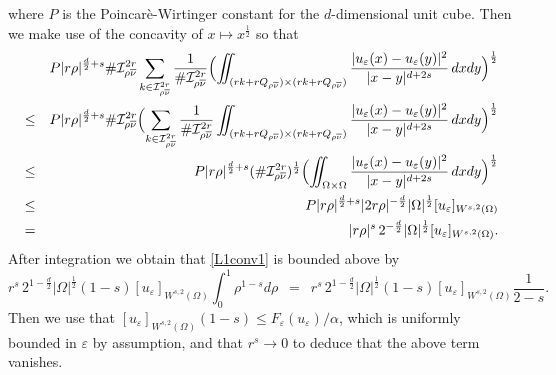\documentclass[11pt,a4paper,reqno]{amsart}
\theoremstyle{plain}
\theoremstyle{definition}
\newcommand\e{\varepsilon}
\theoremstyle{remark}
\begin{document}
where $P$ is the Poincarè-Wirtinger constant for the  $d$-dimensional unit cube. Then we make use of the concavity of $x\mapsto x^{\frac{1}{2}}$ so that   
\begin{eqnarray*} && \hskip-1.8cm \nonumber
P|r\rho|^{\frac{d}{2}+s} \# \mathcal{I}^{2r}_{\rho\overline{\nu}} \sum_{k\in \mathcal{I}^{2r}_{\rho\overline{\nu}}}\frac{1}{\# \mathcal{I}^{2r}_{\rho\overline{\nu}}} \Bigl(\iint_{(rk+rQ_{\rho\overline{\nu}})\times(rk+rQ_{\rho\overline{\nu}})}\frac{|u_\e(x)-u_\e(y)|^2}{|x-y|^{d+2s}}\,dxdy\Bigr)^{\frac{1}{2}} \\ \nonumber
&\leq& P|r\rho|^{\frac{d}{2}+s} \# \mathcal{I}^{2r}_{\rho\overline{\nu}} \Bigl( \sum_{k\in \mathcal{I}^{2r}_{\rho\overline{\nu}}} \frac{1}{\# \mathcal{I}^{2r}_{\rho\overline{\nu}}} \iint_{(rk+rQ_{\rho\overline{\nu}})\times(rk+rQ_{\rho\overline{\nu}})}\frac{|u_\e(x)-u_\e(y)|^2}{|x-y|^{d+2s}}\,dxdy  \Bigr)^{\frac{1}{2}} \\ \nonumber
&\leq& P|r\rho|^{\frac{d}{2}+s}  (\# \mathcal{I}^{2r}_{\rho\overline{\nu}})^{\frac{1}{2}} \Bigl( \iint_{\Omega \times \Omega}\frac{|u_\e(x)-u_\e(y)|^2}{|x-y|^{d+2s}}\,dxdy \Bigr)^{\frac{1}{2}} \\ \nonumber
&\leq& P|r\rho|^{\frac{d}{2}+s} |2 r\rho|^{-\frac{d}{2}}|\Omega|^{\frac{1}{2}}[u_\e]_{W^{s,2}(\Omega)} \\ \nonumber
&=& |r\rho|^s\,2^{-\frac{d}{2}} |\Omega|^{\frac{1}{2}} [u_\e]_{W^{s,2}(\Omega)}.
\end{eqnarray*} 
After integration we obtain that \eqref{L1conv1} is bounded above by
\begin{equation*}
r^s\,2^{1-\frac{d}{2}}|\Omega|^{\frac{1}{2}}(1-s) [u_\e]_{W^{s,2}(\Omega)} \int_0^1 \rho^{1-s}d\rho\,\,\, = \,\,\,r^s\,2^{1-\frac{d}{2}}|\Omega|^{\frac{1}{2}}(1-s) [u_\e]_{W^{s,2}(\Omega)} \frac{1}{2-s}.
\end{equation*}
Then we use that $[u_\e]_{W^{s,2}(\Omega)}(1-s)\leq F_\e(u_\e)/\alpha$, which is uniformly bounded in $\e$ by assumption, and that $r^s\to0$ to deduce that the above term vanishes.

\smallskip
\end{document}
